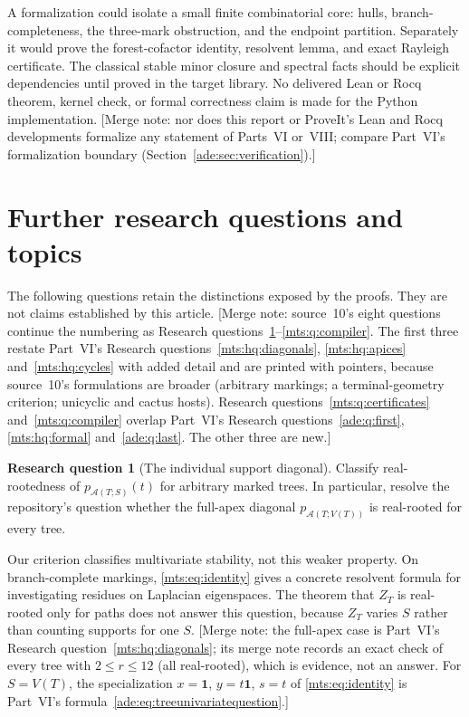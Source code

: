 \documentclass[11pt]{article}
\numberwithin{equation}{section}
\theoremstyle{definition}
\newtheorem{question}{Research question}%
\newcommand{\one}{\mathbf 1}
\newcommand{\calA}{\mathcal A}
\begin{document}
A formalization could isolate a small finite combinatorial core: hulls,
branch-completeness, the three-mark obstruction, and the endpoint
partition. Separately it would prove the forest-cofactor identity,
resolvent lemma, and exact Rayleigh certificate. The classical stable
minor closure and spectral facts should be explicit dependencies until
proved in the target library. No delivered Lean or Rocq theorem, kernel
check, or formal correctness claim is made for the Python implementation.
[Merge note: nor does this report or ProveIt's Lean and Rocq developments
formalize any statement of Parts~VI or~VIII; compare Part~VI's
formalization boundary (Section~\ref{ade:sec:verification}).]

\section{Further research questions and topics}\label{mts:sec:questions}

The following questions retain the distinctions exposed by the proofs.
They are not claims established by this article.
[Merge note: source~10's eight questions continue the numbering as
Research questions~\ref{mts:q:diagonal}--\ref{mts:q:compiler}. The first
three restate Part~VI's Research questions~\ref{mts:hq:diagonals},
\ref{mts:hq:apices} and~\ref{mts:hq:cycles} with added detail and are
printed with pointers, because source~10's formulations are broader
(arbitrary markings; a terminal-geometry criterion; unicyclic and cactus
hosts). Research questions~\ref{mts:q:certificates}
and~\ref{mts:q:compiler} overlap Part~VI's Research
questions~\ref{ade:q:first}, \ref{mts:hq:formal} and~\ref{ade:q:last}.
The other three are new.]

\begin{question}[The individual support diagonal]\label{mts:q:diagonal}
Classify real-rootedness of $p_{\calA(T;S)}(t)$ for arbitrary marked trees.
In particular, resolve the repository's question whether the full-apex
diagonal $p_{\calA(T;V(T))}$ is real-rooted for every tree.
\end{question}
Our criterion classifies multivariate stability, not this weaker
property. On branch-complete markings, \eqref{mts:eq:identity} gives a concrete
resolvent formula for investigating residues on Laplacian eigenspaces.
The theorem that $Z_T$ is real-rooted only for paths does not answer this
question, because $Z_T$ varies $S$ rather than counting supports for one $S$.
[Merge note: the full-apex case is Part~VI's Research
question~\ref{mts:hq:diagonals}; its merge note records an exact check of
every tree with $2\le r\le12$ (all real-rooted), which is evidence, not an
answer. For $S=V(T)$, the specialization $x=\one$, $y=t\one$, $s=t$ of
\eqref{mts:eq:identity} is Part~VI's
formula~\eqref{ade:eq:treeunivariatequestion}.]
\end{document}
